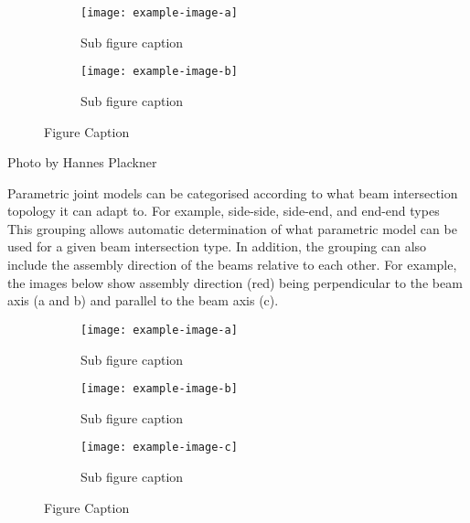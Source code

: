 \begin{figure}
    \centering
    \begin{subfigure}[b]{0.49\textwidth}
        \centering
        \texttt{[image: example-image-a]}
        \caption{Sub figure caption}
    \end{subfigure}
    \hfill
    \begin{subfigure}[b]{0.49\textwidth}
        \centering
        \texttt{[image: example-image-b]}
        \caption{Sub figure caption}
    \end{subfigure}
    \caption{Figure Caption}
\end{figure}


\footnotesize Photo by Hannes Plackner \parencite{HightechDovetails2014}

Parametric joint models can be categorised according to what beam intersection topology it can adapt to. For example, side-side, side-end, and end-end types \parencite{vestartasJoinerySolverWhole2020}This grouping allows automatic determination of what parametric model can be used for a given beam intersection type. In addition, the grouping can also include the assembly direction of the beams relative to each other. For example, the images below show assembly direction (red) being perpendicular to the beam axis (a and b) and parallel to the beam axis (c).

\begin{figure}
     \centering
     \begin{subfigure}[b]{0.32\textwidth}
         \centering
         \texttt{[image: example-image-a]}
         \caption{Sub figure caption}
     \end{subfigure}
     \hfill
     \begin{subfigure}[b]{0.32\textwidth}
         \centering
         \texttt{[image: example-image-b]}
         \caption{Sub figure caption}
     \end{subfigure}
     \hfill
     \begin{subfigure}[b]{0.32\textwidth}
         \centering
         \texttt{[image: example-image-c]}
         \caption{Sub figure caption}
     \end{subfigure}
     \caption{Figure Caption}
\end{figure}




